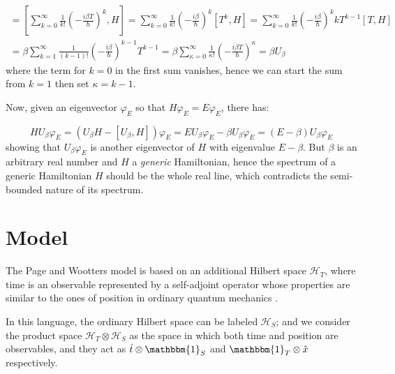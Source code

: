 \documentclass[a0,portrait]{a0poster}
\newcommand{\idop}{\mathbbm{1}}           %
\begin{document}
\begin{multicols}{2}
\begin{multline}
[U_{\beta}, H]  =
\left[
    \sum_{k=0}^{\infty} \frac{1}{k!} \left(- \frac{i\beta T}{\hbar} \right)^k, H
\right]         =
\sum_{k=0}^{\infty} \frac{1}{k!} \left(- \frac{i\beta}{\hbar} \right)^k [T^k, H]
=
\sum_{k=0}^{\infty} \frac{1}{k!} \left(- \frac{i\beta}{\hbar} \right)^k kT^{k-1}[T, H] \\ =
\beta\sum_{k=1}^{\infty} \frac{1}{(k-1)!} \left(- \frac{i\beta}{\hbar} \right)^{k-1} T^{k-1} =
\beta\sum_{\kappa=0}^{\infty} \frac{1}{\kappa!} \left(- \frac{i\beta T}{\hbar} \right)^{\kappa}  =
\beta U_{\beta}
\end{multline}
where the term for $k=0$ in the first sum vanishes, hence we can start the sum from
$k=1$ then set $\kappa=k-1$.

Now, given an eigenvector $\varphi_{E}$ so that $H\varphi_{E}=E\varphi_{E}$, there has:

$$
HU_{\beta}\varphi_{E} = (U_{\beta}H - [U_{\beta}, H])\varphi_{E} =
EU_{\beta}\varphi_{E} - \beta U_{\beta}\varphi_{E} = (E-\beta)U_{\beta}\varphi_{E}
$$
showing that $U_{\beta}\varphi_{E}$ is another eigenvector of $H$ with eigenvalue
$E-\beta$. But $\beta$ is an arbitrary real number and $H$ a \emph{generic} Hamiltonian,
hence the spectrum of a generic Hamiltonian $H$ should
be the whole real line, which contradicts the semi-bounded nature of its spectrum.

\large


\color{DarkSlateGray} %

\section*{Model}

The Page and Wootters model is based on
an additional Hilbert space $\mathcal{H}_T$,
where time is an observable
represented by a self-adjoint operator
whose properties are similar to the ones of position
in ordinary quantum mechanics
\cite{Lloyd:Time, Maccone:Pauli}.

In this language, the ordinary Hilbert space can be labeled $\mathcal{H}_S$;
and we consider the product space $\mathcal{H}_T \otimes \mathcal{H}_S$ as
the space in which both time and position are observables, and they act as
$\hat{t} \otimes \idop_S$ and $\idop_T \otimes \hat{x}$
respectively.


\end{multicols}
\end{document}
